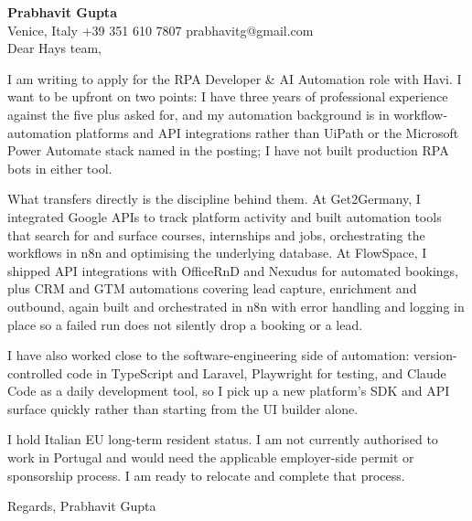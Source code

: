 \documentclass[a4paper,10.5pt]{article}
\begin{document}
\textbf{Prabhavit Gupta}\\
Venice, Italy \textbar{} +39 351 610 7807 \textbar{} prabhavitg@gmail.com\\[10pt]
Dear Hays team,

I am writing to apply for the RPA Developer \& AI Automation role with Havi. I want to be upfront on two points: I have three years of professional experience against the five plus asked for, and my automation background is in workflow-automation platforms and API integrations rather than UiPath or the Microsoft Power Automate stack named in the posting; I have not built production RPA bots in either tool.

What transfers directly is the discipline behind them. At Get2Germany, I integrated Google APIs to track platform activity and built automation tools that search for and surface courses, internships and jobs, orchestrating the workflows in n8n and optimising the underlying database. At FlowSpace, I shipped API integrations with OfficeRnD and Nexudus for automated bookings, plus CRM and GTM automations covering lead capture, enrichment and outbound, again built and orchestrated in n8n with error handling and logging in place so a failed run does not silently drop a booking or a lead.

I have also worked close to the software-engineering side of automation: version-controlled code in TypeScript and Laravel, Playwright for testing, and Claude Code as a daily development tool, so I pick up a new platform's SDK and API surface quickly rather than starting from the UI builder alone.

I hold Italian EU long-term resident status. I am not currently authorised to work in Portugal and would need the applicable employer-side permit or sponsorship process. I am ready to relocate and complete that process.

Regards,
Prabhavit Gupta
\end{document}
